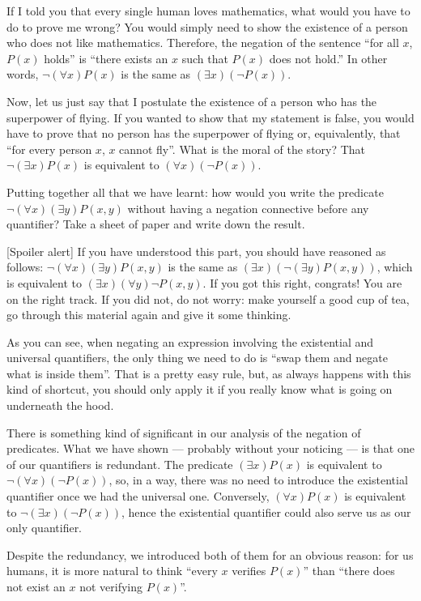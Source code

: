 \begin{para}
If I told you that every single human loves mathematics, what would you have to do to prove me wrong?
You would simply need to show the existence of a person who does not like mathematics.
Therefore, the negation of the sentence ``for all $x$, $P(x)$ holds'' is ``there exists an $x$ such that $P(x)$ does not hold.''
In other words, $\lnot (\forall x) P(x)$ is the same as $(\exists x)(\lnot P(x))$.

Now, let us just say that I postulate the existence of a person who has the superpower of flying.
If you wanted to show that my statement is false, you would have to prove that no person has the superpower of flying or, equivalently, that ``for every person $x$, $x$ cannot fly''.
What is the moral of the story? That $\lnot(\exists x)P(x)$ is equivalent to $(\forall x)(\lnot P(x))$.

Putting together all that we have learnt: how would you write the predicate $\lnot(\forall x)(\exists y)P(x,y)$ without having a negation connective before any quantifier?
Take a sheet of paper and write down the result.

[Spoiler alert]
If you have understood this part, you should have reasoned as follows: $\lnot(\forall x)(\exists y) P(x,y)$ is the same as $(\exists x)(\lnot (\exists y) P(x,y))$, which is equivalent to $(\exists x)(\forall y) \lnot P(x,y)$. If you got this right, congrats! You are on the right track.
If you did not, do not worry: make yourself a good cup of tea, go through this material again and give it some thinking.

As you can see, when negating an expression involving the existential and universal quantifiers, the only thing we need to do is ``swap them and negate what is inside them''.
That is a pretty easy rule, but, as always happens with this kind of shortcut, you should only apply it if you really know what is going on underneath the hood.
\end{para}


\begin{para}
There is something kind of significant in our analysis of the negation of predicates. What we have shown --- probably without your noticing --- is that one of our quantifiers is redundant. The predicate $(\exists x) P(x)$ is equivalent to $\lnot (\forall x)(\lnot P(x))$, so, in a way, there was no need to introduce the existential quantifier once we had the universal one. Conversely, $(\forall x) P(x)$ is equivalent to $\lnot(\exists x)(\lnot P(x))$, hence the existential quantifier could also serve us as our only quantifier.

Despite the redundancy, we introduced both of them for an obvious reason:
for us humans, it is more natural to think ``every $x$ verifies $P(x)$'' than ``there does not exist an $x$ not verifying $P(x)$''.
\end{para}

